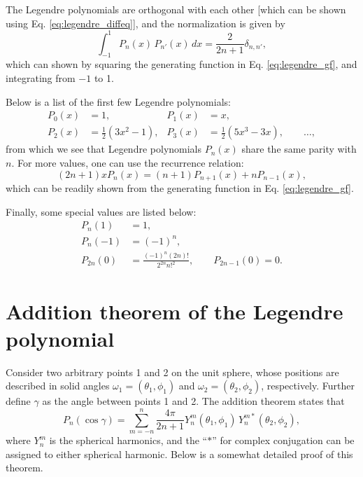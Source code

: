 \documentclass[11pt]{article}
\begin{document}
The Legendre polynomials are orthogonal with each other
[which can be shown using Eq. \eqref{eq:legendre_diffeq}],
and the normalization is given by
\begin{equation}
  \int_{-1}^1
  P_n(x) \, P_{n'}(x) \, dx
=
  \frac { 2 } { 2 n + 1} \delta_{n, n'},
  \label{eq:legendre_orthonormal}
\end{equation}
which can shown by squaring
the generating function in Eq. \eqref{eq:legendre_gf},
and integrating from $-1$ to 1.

Below is a list of the first few Legendre polynomials:
\begin{align*}
  P_0(x) &= 1, &
  P_1(x) &= x, \\
  P_2(x) &= \frac{1}{2}(3 x^2 - 1), &
  P_3(x) &= \frac{1}{2}(5 x^3 - 3 x),
  \qquad \dots,
\end{align*}
from which we see that
Legendre polynomials $P_n(x)$ share the same parity with $n$.
For more values, one can use the recurrence relation:
\begin{equation}
  (2 n + 1) x P_n(x) = (n + 1) P_{n+1}(x) + n P_{n-1}(x),
\end{equation}
which can be readily shown from the generating function in Eq. \eqref{eq:legendre_gf}.

Finally, some special values are listed below:
\begin{align}
  P_n(1)    &= 1,
  \label{eq:legendre_1} \\
  P_n(-1)   &= (-1)^n,
  \label{eq:legendre_neg1} \\
  P_{2n}(0) &= \frac{ (-1)^n (2n)! }{ 2^{2n} n!^2 },
  \qquad
  P_{2n-1}(0) = 0.
  \label{eq:legendre_0}
\end{align}



\section{Addition theorem of the Legendre polynomial}



Consider two arbitrary points 1 and 2 on the unit sphere,
whose positions are described in solid angles
$\omega_1 = (\theta_1, \phi_1)$
and
$\omega_2 = (\theta_2, \phi_2)$, respectively.
%
Further define $\gamma$ as the angle between points 1 and 2.
%
The addition theorem states that
\begin{equation}
  P_n(\cos\gamma)
= \sum_{m = -n}^n \frac{ 4 \pi } { 2 n + 1 }
  Y_n^m(\theta_1, \phi_1) \, Y_n^{m*}(\theta_2, \phi_2),
\label{eq:addition}
\end{equation}
where $Y_n^m$ is the spherical harmonics,
and the ``$*$'' for complex conjugation
can be assigned to either spherical harmonic.
Below is a somewhat detailed proof of this theorem.
\end{document}
